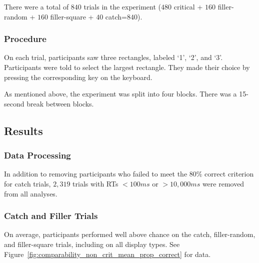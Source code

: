 There were a total of $840$ trials in the experiment ($480$ critical + $160$ filler-random + $160$ filler-square + $40$ catch=$840$).

\subsubsection{Procedure}
On each trial, participants saw three rectangles, labeled `1', `2', and `3'. Participants were told to select the largest rectangle. They made their choice by pressing the corresponding key on the keyboard. 

As mentioned above, the experiment was split into four blocks. There was a 15-second break between blocks.

\subsection{Results}

\subsubsection{Data Processing}
In addition to removing participants who failed to meet the $80\%$ correct criterion for catch trials, $2,319$ trials with RTs $<100ms$ or $>10,000ms$ were removed from all analyses. 

\subsubsection{Catch and Filler Trials}
On average, participants performed well above chance on the catch, filler-random, and filler-square trials, including on all display types. See Figure~\ref{fig:comparability_non_crit_mean_prop_correct} for data.

